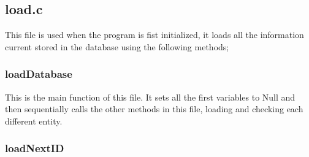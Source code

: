 \documentclass{article}
\begin{document}
\subsection{load.c}
This file is used when the program is fist initialized, it loads all the information current stored in the database using the following methods;
\subsubsection*{loadDatabase}
This is the main function of this file. It sets all the first variables to Null
and then sequentially calls the other methods in this file, loading and checking each different entity.
\subsubsection*{loadNextID}
\end{document}
